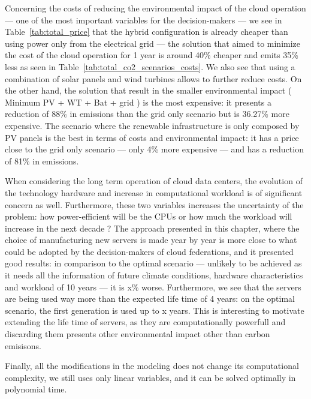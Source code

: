 Concerning the costs of reducing the environmental impact of the cloud operation --- one of the most important variables for the decision-makers --- we see in Table~\ref {tab:total_price} that the hybrid configuration is already cheaper than using power only from the electrical grid --- the solution that aimed to minimize the cost of the cloud operation for 1 year is around 40\% cheaper and emits 35\% less  as seen in Table~\ref{tab:total_co2_scenarios_costs}. We also see that using a combination of solar panels and wind turbines allows to further reduce costs. On the other hand, the solution that result in the smaller environmental impact ( Minimum  PV + WT + Bat + grid ) is the most expensive: it presents a reduction of 88\% in  emissions than the grid only scenario but is 36.27\% more expensive. The scenario where the renewable infrastructure is only composed by PV panels is the best in terms of costs and environmental impact: it has a price close to the grid only scenario --- only 4\% more expensive --- and has a reduction of 81\% in  emissions.


When considering the long term operation of cloud data centers, the evolution of the technology hardware and increase in computational workload is of significant concern as well. Furthermore, these two variables increases the uncertainty of the problem: how power-efficient will be the CPUs or how much the workload will increase in the next decade ? The approach presented in this chapter, where the choice of manufacturing new servers is made year by year is more close to what could be adopted by the decision-makers of cloud federations, and it presented good results: in comparison to the optimal scenario --- unlikely to be achieved as it needs all the information of future climate conditions, hardware characteristics and workload of 10 years --- it is x\% worse. Furthermore, we see that the servers are being used way more than the expected life time of 4 years: on the optimal scenario, the first generation is used up to x years. This is interesting to motivate extending the life time of servers, as they are computationally powerfull and discarding them presents other environmental impact other than carbon emisisons. 


Finally, all the modifications in the modeling does not change its computational complexity, we still uses only linear variables, and it can be solved optimally in polynomial time.


